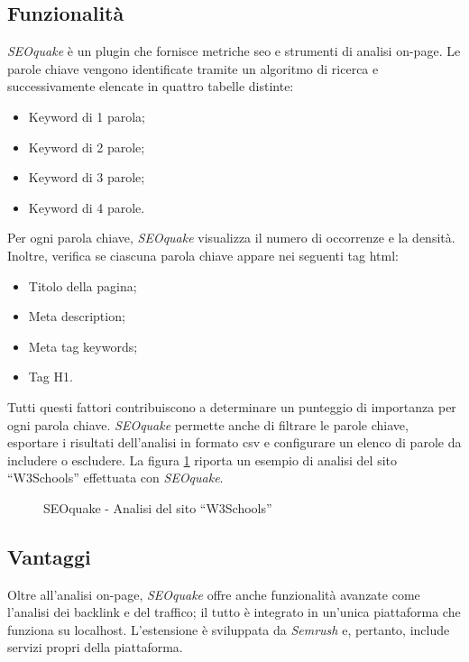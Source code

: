 \subsection{Funzionalità}
\par \textit{SEOquake} è un plugin che fornisce metriche \gls{seo} e strumenti di analisi \gls{on-page}. Le parole chiave vengono identificate tramite un algoritmo di ricerca e successivamente elencate in quattro tabelle distinte:
\begin{itemize}
    \item Keyword di 1 parola;
    \item Keyword di 2 parole;
    \item Keyword di 3 parole;
    \item Keyword di 4 parole.
\end{itemize}
\vspace{5pt}
\par\noindent Per ogni parola chiave, \textit{SEOquake} visualizza il numero di occorrenze e la densità. Inoltre, verifica se ciascuna parola chiave appare nei seguenti tag \gls{html}:
\begin{itemize}
    \item Titolo della pagina;
    \item Meta description;
    \item Meta tag keywords;
    \item Tag H1.
\end{itemize}
\vspace{5pt}
\par\noindent Tutti questi fattori contribuiscono a determinare un punteggio di importanza per ogni parola chiave. \textit{SEOquake} permette anche di filtrare le parole chiave, esportare i risultati dell'analisi in formato \gls{csv} e configurare un elenco di parole da includere o escludere. La figura \ref{fig:seoquake_w3schools} riporta un esempio di analisi del sito “W3Schools” effettuata con \textit{SEOquake}.

\begin{figure}[H]
    \centering 
    \caption{SEOquake - Analisi del sito “W3Schools”}
    \label{fig:seoquake_w3schools}
\end{figure}

\subsection{Vantaggi}
\par Oltre all'analisi \gls{on-page}, \textit{SEOquake} offre anche funzionalità avanzate come l'analisi dei \gls{backlink} e del traffico; il tutto è integrato in un'unica piattaforma che funziona su \gls{localhost}. L'estensione è sviluppata da \textit{Semrush} e, pertanto, include servizi propri della piattaforma.

